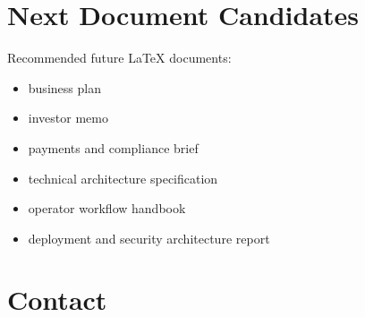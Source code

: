 \documentclass[11pt,a4paper]{article}
\begin{document}
\section{Next Document Candidates}

Recommended future LaTeX documents:
\begin{itemize}
    \item business plan
    \item investor memo
    \item payments and compliance brief
    \item technical architecture specification
    \item operator workflow handbook
    \item deployment and security architecture report
\end{itemize}

\section{Contact}

\KazeContactBlock
\end{document}
